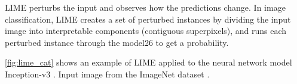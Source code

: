 

LIME \cite{ribeiro2016should} perturbs the input and observes how the predictions change. In image classification,  LIME creates a set of perturbed instances by dividing the input image into interpretable components (contiguous superpixels), and runs each perturbed instance through the model26
to get a probability.

\autoref{fig:lime_cat} shows an example of LIME applied to the neural network model Inception-v3 \cite{szegedy2016rethinking}. Input image from the ImageNet dataset \cite{ILSVRC15}.

